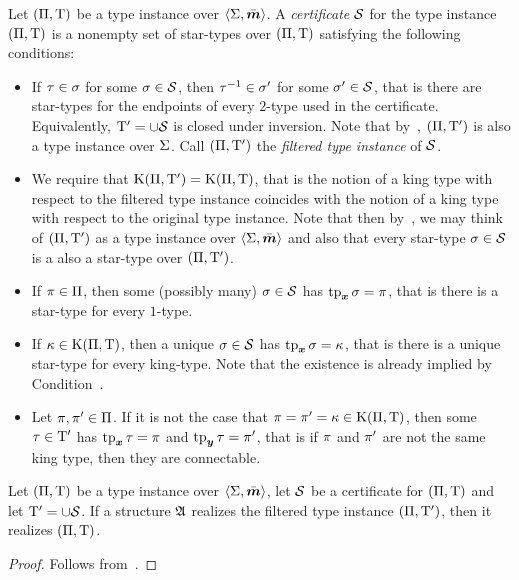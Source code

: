 \begin{definition}
Let $(\Pi,\mathrm{T})$ be a type instance over $\left\langle \mathrm{\Sigma},\bar{\bm{m}} \right\rangle$.
A \emph{certificate} $\mathcal{S}$ for the type instance
$(\Pi,\mathrm{T})$ is a nonempty set of star-types over $(\Pi,\mathrm{T})$
satisfying the following conditions:
\begin{itemize}
  \item[\condcerti]\label{cond:certi}
  If $\tau\in\sigma$ for some $\sigma\in\mathcal{S}$, then $\tau^{-1}\in\sigma'$ for
  some $\sigma'\in\mathcal{S}$, that is there are star-types for the endpoints of every
  $2$-type used in the certificate. Equivalently, ${\mathrm{T}'} = \cup\mathcal{S}$ is closed
  under inversion.
  Note that by~, $(\Pi,{\mathrm{T}'})$ is also a type instance
  over $\mathrm{\Sigma}$. Call $(\Pi,{\mathrm{T}'})$ the \emph{filtered type instance} of
  $\mathcal{S}$.
  \item[\condcertK]\label{cond:certK}
  We require that $\mathrm{K}(\Pi,{\mathrm{T}'}) = \mathrm{K}(\Pi,\mathrm{T})$, that is the notion of a
  king type with respect to the filtered type instance coincides with the notion
  of a king type with respect to the original type instance.
  Note that then by~, we may think of $(\Pi,{\mathrm{T}'})$ as a
  type instance over $\left\langle \mathrm{\Sigma},\bar{\bm{m}} \right\rangle$ and also that every star-type
  $\sigma \in \mathcal{S}$ is a also a star-type over $(\Pi,{\mathrm{T}'})$. 
  
  
  \item[\condcertp]\label{cond:certp}
  If $\pi \in \Pi$, then some (possibly many) $\sigma \in \mathcal{S}$ has
  $\operatorname{tp}_{\bm{x}}\sigma = \pi$, that is there is a star-type for every $1$-type.
  \item[\condcertk]\label{cond:certk}
  If $\kappa \in \mathrm{K}(\Pi,\mathrm{T})$, then a unique $\sigma \in \mathcal{S}$ has
  $\operatorname{tp}_{\bm{x}}\sigma = \kappa$, that is there is a unique star-type for every king-type.
  Note that the existence is already implied by Condition~.
  \item[\condcertc]\label{cond:certc}
  Let $\pi, {\pi'} \in \Pi$. If it is not the case that $\pi =
  {\pi'} = \kappa \in \mathrm{K}(\Pi,\mathrm{T})$, then some $\tau \in {\mathrm{T}'}$ has
  $\operatorname{tp}_{\bm{x}}\tau = \pi$ and $\operatorname{tp}_{\bm{y}}\tau = {\pi'}$, that is if $\pi$ and ${\pi'}$
  are not the same king type, then they are connectable.
\end{itemize}
\end{definition}

\begin{remark}\label{rem:filtered-realiz}
Let $(\Pi,\mathrm{T})$ be a type instance over $\left\langle \mathrm{\Sigma},\bar{\bm{m}} \right\rangle$,
let $\mathcal{S}$ be a certificate for $(\Pi,\mathrm{T})$ and let ${\mathrm{T}'} = \cup\mathcal{S}$.
If a structure $\mathfrak{A}$ realizes the filtered type instance $(\Pi,{\mathrm{T}'})$,
then it realizes $(\Pi,\mathrm{T})$.
\end{remark}
\begin{proof}
Follows from~.
\end{proof}

